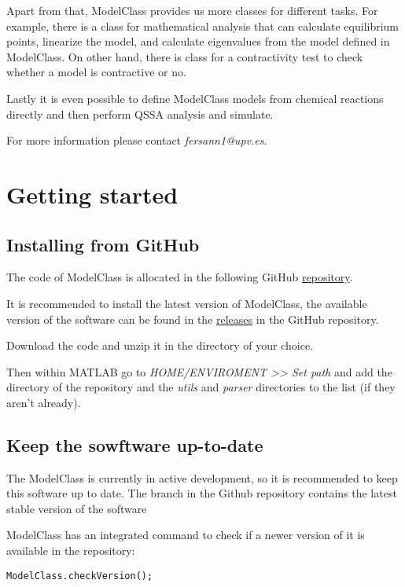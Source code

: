 \documentclass[11pt]{article}
\begin{document}
Apart from that, ModelClass provides us more classes for different tasks. For example, there is a class for mathematical analysis that can calculate equilibrium points, linearize the model, and calculate eigenvalues from the model defined in ModelClass. On other hand, there is class for a contractivity test to check whether a model is contractive or no.

Lastly it is even possible to define ModelClass models from chemical reactions directly and then perform QSSA analysis and simulate.

For more information please contact \textit{fersann1@upv.es}.

\section{Getting started}

\subsection{Installing from GitHub}

The code of ModelClass is allocated in the following GitHub \href{https://github.com/sb2cl/ModelClass}{repository}.

It is recommended to install the latest version of ModelClass, the available version of the software can be found in the \href{https://github.com/sb2cl/ModelClass/releases}{releases} in the GitHub repository.

Download the code and unzip it in the directory of your choice.

Then within MATLAB go to \textit{HOME/ENVIROMENT >> Set path} and add the directory of the repository and the \textit{utils} and \textit{parser} directories to the list (if they aren't already).

\subsection{Keep the sowftware up-to-date}

The ModelClass is currently in active development, so it is recommended to keep this software up to date. The  branch in the Github repository contains the latest stable version of the software

ModelClass has an integrated command to check if a newer version of it is available in the repository:
\begin{lstlisting}
ModelClass.checkVersion();
\end{lstlisting}
\end{document}
